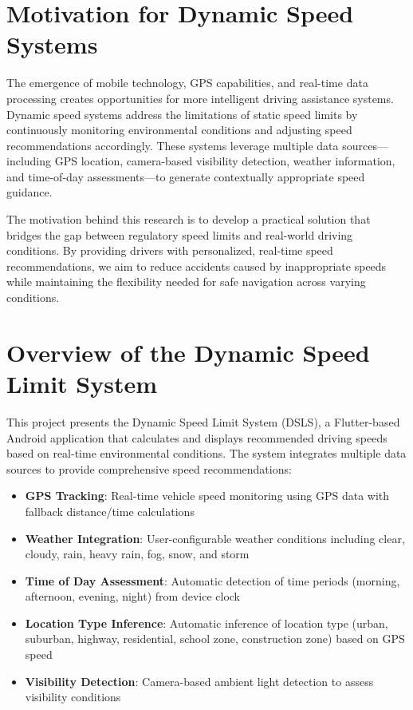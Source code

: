 \section{Motivation for Dynamic Speed Systems}
The emergence of mobile technology, GPS capabilities, and real-time data processing creates opportunities for more intelligent driving assistance systems. Dynamic speed systems address the limitations of static speed limits by continuously monitoring environmental conditions and adjusting speed recommendations accordingly. These systems leverage multiple data sources—including GPS location, camera-based visibility detection, weather information, and time-of-day assessments—to generate contextually appropriate speed guidance.

The motivation behind this research is to develop a practical solution that bridges the gap between regulatory speed limits and real-world driving conditions. By providing drivers with personalized, real-time speed recommendations, we aim to reduce accidents caused by inappropriate speeds while maintaining the flexibility needed for safe navigation across varying conditions.

\section{Overview of the Dynamic Speed Limit System}
This project presents the Dynamic Speed Limit System (DSLS), a Flutter-based Android application that calculates and displays recommended driving speeds based on real-time environmental conditions. The system integrates multiple data sources to provide comprehensive speed recommendations:

\begin{itemize}
    \item \textbf{GPS Tracking}: Real-time vehicle speed monitoring using GPS data with fallback distance/time calculations
    \item \textbf{Weather Integration}: User-configurable weather conditions including clear, cloudy, rain, heavy rain, fog, snow, and storm
    \item \textbf{Time of Day Assessment}: Automatic detection of time periods (morning, afternoon, evening, night) from device clock
    \item \textbf{Location Type Inference}: Automatic inference of location type (urban, suburban, highway, residential, school zone, construction zone) based on GPS speed
    \item \textbf{Visibility Detection}: Camera-based ambient light detection to assess visibility conditions
\end{itemize}

